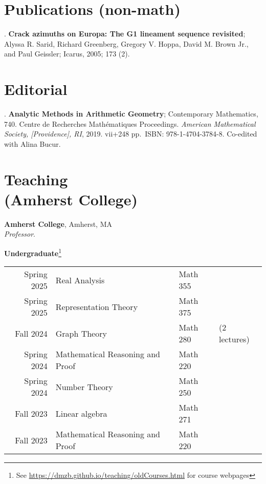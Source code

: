 \documentclass[margin,line]{res}
\newcounter{pubs}
\newcommand{\defi}[1]{\textsf{#1}} 				%
\begin{document}
\begin{resume}
\section{\sc Publications (non-math)}

 .  \textbf{Crack azimuths on Europa: The G1 lineament sequence revisited}; Alyssa R. Sarid, Richard Greenberg, Gregory V. Hoppa, David M. Brown Jr., and Paul Geissler; Icarus, 2005; 173 (2). \vspace{.08cm}\\ 


\section{\sc Editorial}


 .  \textbf{Analytic Methods in Arithmetic Geometry}; Contemporary
Mathematics, 740. Centre de Recherches Math\'ematiques Proceedings. \emph{American Mathematical Society, [Providence], RI}, 2019. vii+248 pp.~ISBN: 978-1-4704-3784-8. Co-edited with Alina Bucur. \vspace{.08cm}\\ 


\newpage
\vspace{-7pt}
\section{\sc Teaching \\ (Amherst College)}

{\bf Amherst College}, Amherst, MA\\
\emph{Professor}. 
\vspace{2pt}




{\bf Undergraduate}\footnote{See \url{https://dmzb.github.io/teaching/oldCourses.html} for course webpages}
\vspace*{-.1in}

\begin{tabular}{rlll}
 Spring 2025 & \defi{Real Analysis} & Math 355\\  
 Spring 2025 & \defi{Representation Theory} & Math 375\\  
 Fall 2024 & \defi{Graph Theory} & Math 280& (2 lectures)\\    
 Spring 2024 & \defi{Mathematical Reasoning and Proof} & Math 220&\\  
 Spring 2024 & \defi{Number Theory} & Math 250&\\  
 Fall 2023 & \defi{Linear algebra} & Math 271&\\  
 Fall 2023 & \defi{Mathematical Reasoning and Proof} & Math 220&\\  
\end{tabular}


\end{resume}
\end{document}
